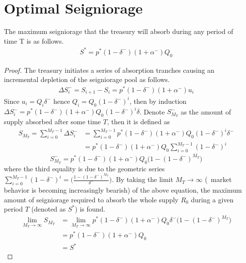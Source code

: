\section{Optimal Seigniorage}
\begin{lemma} \label{lemma:Smax}
The maximum seigniorage that the treasury will absorb during any period of time T is as follows.
\begin{align*}
S^* = p^*(1-\delta^-)(1+\alpha^-)Q_0
\end{align*}
\end{lemma}
%
\begin{proof}
The treasury initiates a series of absorption tranches causing an incremental depletion of the seigniorage pool as follows.
%
\begin{align*}
\Delta S_i^- = S_{i+1} - S_i = p^*(1-\delta^-)(1+\alpha^-)u_i 
\end{align*}
%
Since $u_i = Q_i \delta^-$ hence $Q_i = Q_0(1-\delta^-)^i$, then by induction $\Delta S_i^- = p^*(1-\delta^-)(1+\alpha^-)Q_0(1-\delta^-)^i \delta$. Denote $S_{M_T}^-$ as the amount of supply absorbed after some time $T$, then it is defined as
%
 \begin{align*}
S_{M_T} = \sum_{i=0}^{M_T - 1} \Delta S^-_i & = \sum_{i=0}^{M_T - 1} p^*(1-\delta^-)(1+\alpha^-)Q_0(1-\delta^-)^i\delta^- \\
& = p^*(1-\delta^-)(1+\alpha^-)Q_0\sum_{i=0}^{M_T - 1}(1-\delta^-)^i
\end{align*}
\begin{equation} \label{eq:Sdeplete}
S_{M_T}^- = p^*(1-\delta^-)(1+\alpha^-)Q_0\big( 1 - (1-\delta^-)^{M_T} \big)
\end{equation}
%
where the third equality is due to the geometric series $\sum_{i=0}^{M_T - 1}(1-\delta^-)^i = \big( \frac{1 - (1-\delta^-)^{M_T}}{\delta^-}\big)$. By taking the limit $M_T \rightarrow \infty$ (\ie\ market behavior is becoming increasingly bearish) of the above equation, the maximum amount of seigniorage required to absorb the whole supply $R_0$ during a given period $T$ (denoted as $S^*$) is found.
%
\begin{align*}
\lim_{M_T \to \infty} S_{M_T} & = \lim_{M_T \to \infty} p^*(1-\delta^-)(1+\alpha^-)Q_0\delta^-\big( 1 - (1-\delta^-)^{M_T} \big) \\
& = p^*(1-\delta^-)(1+\alpha^-)Q_0 \\
& = S^*
\end{align*}
\end{proof}

